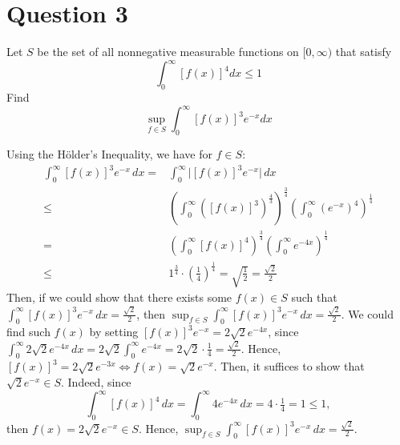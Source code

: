 \section{Question 3}

\begin{question}
    [15 points] Let $S$ be the set of all nonnegative measurable functions on $[0, \infty)$ that satisfy
    $$
    \int_0^{\infty}[f(x)]^4 d x \leq 1
    $$
    Find
    $$
    \sup _{f \in S} \int_0^{\infty}[f(x)]^3 e^{-x} d x
    $$
\end{question}

\begin{answer}
    Using the Hölder's Inequality, we have for $f \in S$:
    \begin{equation}
        \begin{aligned}
            \int_0^{\infty} [f(x)]^3 e^{-x} \,dx = & \int_0^{\infty} \lvert [f(x)]^3e^{-x} \rvert \,dx\\
            \leq &\left(\int_0^{\infty}([f(x)]^3)^{\frac{4}{3}}\right)^{\frac{3}{4}}\left(\int_0^{\infty}(e^{-x})^4\right)^{\frac{1}{4}}\\
            = &\left(\int_0^{\infty}[f(x)]^4\right)^{\frac{3}{4}}\left(\int_0^{\infty}e^{-4x}\right)^{\frac{1}{4}}\\
            \leq &1^{\frac{3}{4}} \cdot \left(\tfrac{1}{4}\right)^{\frac{1}{4}} = \sqrt{\tfrac{1}{2}} = \tfrac{\sqrt{2}}{2}
        \end{aligned}
    \end{equation}
    Then, if we could show that there exists some $f(x) \in S$ such that $\int_0^{\infty} [f(x)]^3 e^{-x} \,dx = \tfrac{\sqrt{2}}{2}$, then $\sup_{f \in S} \int_0^{\infty} [f(x)]^3 e^{-x} \,dx = \tfrac{\sqrt{2}}{2}$. We could find such $f(x)$ by setting $[f(x)]^3e^{-x} = 2\sqrt{2} e^{-4x}$, since $\int_0^{\infty}2\sqrt{2}e^{-4x} \,dx = 2\sqrt{2}\int_0^{\infty}e^{-4x} = 2\sqrt{2} \cdot \tfrac{1}{4} = \tfrac{\sqrt{2}}{2}$. Hence, $[f(x)]^3 = 2\sqrt{2}e^{-3x} \Leftrightarrow f(x) = \sqrt{2}e^{-x}$. Then, it suffices to show that $\sqrt{2}e^{-x} \in S$. Indeed, since
    \begin{equation}
        \int_0^{\infty} [f(x)]^4\,dx = \int_0^{\infty} 4e^{-4x} \,dx = 4\cdot \tfrac{1}{4} = 1 \leq 1,
    \end{equation}
    then $f(x) = 2\sqrt{2}e^{-x} \in S$. Hence, $\sup_{f \in S} \int_0^{\infty}[f(x)]^3 e^{-x} \,dx = \tfrac{\sqrt{2}}{2}$.
\end{answer}